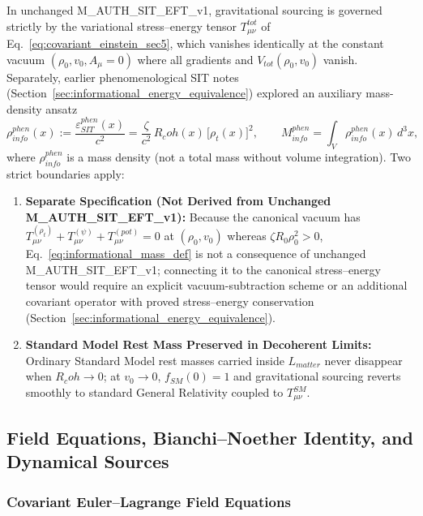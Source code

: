 \documentclass[american,11pt,letterpaper]{article}
\newcommand{\Rcoh}{R_{\mathrm{coh}}}
\def\mathcal#1{#1}%
\def\mathrm#1{#1}%
\def\texttt#1{#1}%
\def\emph#1{#1}%
\def\Rcoh{R_coh}%
\begin{document}
In unchanged \texttt{M\_AUTH\_SIT\_EFT\_v1}, gravitational sourcing is governed strictly by the variational stress--energy tensor $T_{\mu\nu}^{\mathrm{tot}}$ of Eq.~\eqref{eq:covariant_einstein_sec5}, which vanishes identically at the constant vacuum $(\rho_0, v_0, A_\mu = 0)$ where all gradients and $V_{\mathrm{tot}}(\rho_0, v_0)$ vanish. Separately, earlier phenomenological SIT notes (Section~\ref{sec:informational_energy_equivalence}) explored an auxiliary mass-density ansatz
\begin{equation}
\rho_{\mathrm{info}}^{\mathrm{phen}}(x) := \frac{\varepsilon_{\mathrm{SIT}}^{\mathrm{phen}}(x)}{c^2} = \frac{\zeta}{c^2}\,\Rcoh(x)\,\bigl[\rho_t(x)\bigr]^2,
\qquad
M_{\mathrm{info}}^{\mathrm{phen}} = \int_{\mathcal{V}} \rho_{\mathrm{info}}^{\mathrm{phen}}(x)\,d^3x,
\label{eq:informational_mass_def}
\end{equation}
where $\rho_{\mathrm{info}}^{\mathrm{phen}}$ is a \emph{mass density} (not a total mass without volume integration). Two strict boundaries apply:
\begin{enumerate}[leftmargin=2em]
  \item \textbf{Separate Specification (Not Derived from Unchanged \texttt{M\_AUTH\_SIT\_EFT\_v1}):} Because the canonical vacuum has $T_{\mu\nu}^{(\rho_t)} + T_{\mu\nu}^{(\psi)} + T_{\mu\nu}^{(\mathrm{pot})} = 0$ at $(\rho_0, v_0)$ whereas $\zeta R_0 \rho_0^2 > 0$, Eq.~\eqref{eq:informational_mass_def} is \emph{not} a consequence of unchanged \texttt{M\_AUTH\_SIT\_EFT\_v1}; connecting it to the canonical stress--energy tensor would require an explicit vacuum-subtraction scheme or an additional covariant operator with proved stress--energy conservation (Section~\ref{sec:informational_energy_equivalence}).
  \item \textbf{Standard Model Rest Mass Preserved in Decoherent Limits:} Ordinary Standard Model rest masses carried inside $\mathcal{L}_{\mathrm{matter}}$ never disappear when $\Rcoh \to 0$; at $v_0 \to 0$, $f_{\mathrm{SM}}(0) = 1$ and gravitational sourcing reverts smoothly to standard General Relativity coupled to $T_{\mu\nu}^{\mathrm{SM}}$.
\end{enumerate}

\subsection{Field Equations, Bianchi--Noether Identity, and Dynamical Sources}
\label{sec:stress-energy}

\subsubsection{Covariant Euler--Lagrange Field Equations}
\end{document}
